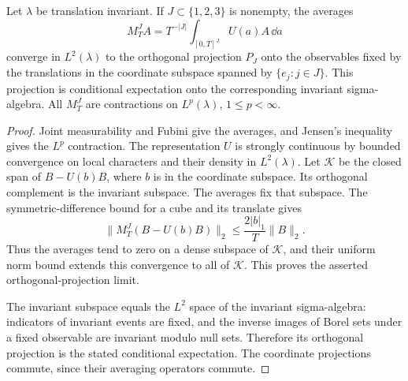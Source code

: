 \begin{lemma}\label{lem:averages-translations}
Let \(\lambda\) be translation invariant. If \(J\subset\{1,2,3\}\)
is nonempty, the averages
\[
 M_T^J A=T^{-|J|}\int_{[0,T]^J}U(a)A\,\dd a
\]
converge in \(L^2(\lambda)\) to the orthogonal projection \(P_J\)
onto the observables fixed by the translations in the coordinate
subspace spanned by \(\{e_j:j\in J\}\).
This projection is conditional expectation onto the corresponding
invariant sigma-algebra. All \(M_T^J\) are contractions on
\(L^p(\lambda)\), \(1\le p<\infty\).
\end{lemma}
\begin{proof}
Joint measurability and Fubini give the averages, and Jensen's
inequality gives the \(L^p\) contraction. The representation \(U\)
is strongly continuous by bounded convergence on local characters
and their density in \(L^2(\lambda)\).
Let \(\mathcal K\) be the closed span of
\(B-U(b)B\), where \(b\) is in the coordinate subspace.
Its orthogonal complement is the invariant subspace.
The averages fix that subspace. The symmetric-difference bound
for a cube and its translate gives
\[
 \|M_T^J(B-U(b)B)\|_2
 \le\frac{2|b|_1}{T}\|B\|_2.
\]
Thus the averages tend to zero on a dense subspace of
\(\mathcal K\), and their uniform norm bound extends this
convergence to all of \(\mathcal K\).
This proves the asserted orthogonal-projection limit.

The invariant subspace equals the \(L^2\) space of the invariant
sigma-algebra: indicators of invariant events are fixed, and
the inverse images of Borel sets under a fixed observable are
invariant modulo null sets. Therefore its orthogonal projection
is the stated conditional expectation. The coordinate projections
commute, since their averaging operators commute.
\end{proof}
